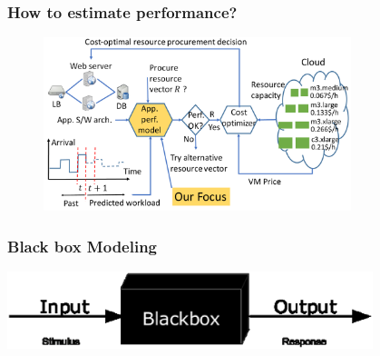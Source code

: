 \documentclass{beamer}
\begin{document}
\begin{frame}
\frametitle{How to estimate performance?}
\begin{figure}[htbp]
\centering
\includegraphics[width=0.8\textwidth]{system}
\end{figure}
\end{frame}

\begin{frame}
\frametitle{Black box Modeling}
\includegraphics[width=0.8\textwidth]{blackbox.eps}
\end{frame}
\end{document}
